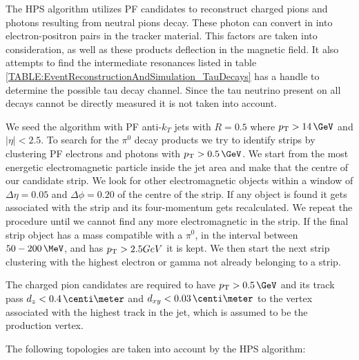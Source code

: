 
The \gls{HPS} algorithm utilizes \gls{PF} candidates to reconstruct charged pions and photons resulting from neutral pions decay. These photon can convert in into electron-positron pairs in the tracker material. This factors are taken into consideration, as well as these products deflection in the magnetic field. It also attempts to find the intermediate resonances listed in table \ref{TABLE:EventReconstructionAndSimulation_TauDecays} has a handle to determine the possible tau decay channel. Since the tau neutrino present on all decays cannot be directly measured it is not taken into account.


We seed the algorithm with \gls{PF} anti-$k_T$ jets with $R = 0.5$ where $\pt>14\,\GeV$ and $|\eta|<2.5$. To search for the $\pi^{0}$ decay products we try to identify strips by clustering \gls{PF} electrons and photons with $\pt>0.5\,\GeV$. We start from the most energetic electromagnetic particle inside the jet area and make that the centre of our candidate strip. We look for other electromagnetic objects within a window of $\Delta\eta = 0.05$ and $\Delta\phi = 0.20$ of the centre of the strip. If any object is found it gets associated with the strip and its four-momentum gets recalculated. We repeat the procedure until we cannot find any more electromagnetic in the strip. If the final strip object has a mass compatible with a $\pi^{0}$, in the interval between $50-200\,\MeV$, and has $p_{\mathrm{T}} > 2.5 GeV$ it is kept. We then start the next strip clustering with the highest \pt electron or gamma not already belonging to a strip.

The charged pion candidates are required to have $\pt > 0.5\,\GeV$ and its track pass $d_z < 0.4\,\centi\meter$ and $d_{xy} < 0.03\,\centi\meter$ to the vertex associated with the highest \pt track in the jet, which is assumed to be the \tau production vertex.

The following topologies are taken into account by the \gls{HPS} algorithm:

